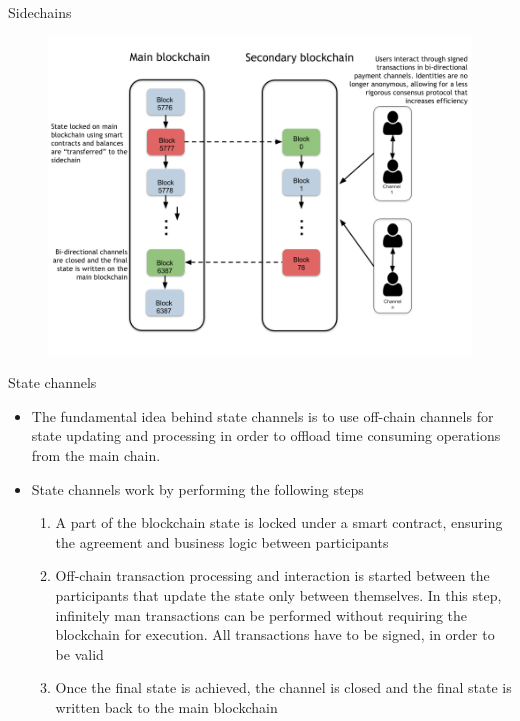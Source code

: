 \documentclass[11pt]{beamer}
\begin{document}

\begin{frame}{Sidechains}
	\begin{figure}[]
		\centering
		\includegraphics  [scale=0.3]{Images/sidechain}
	\end{figure}
\end{frame}


\begin{frame}{State channels}
	\begin{itemize}
		\item The fundamental idea behind state channels is to use off-chain channels for state updating and processing in order to offload time consuming operations from the main chain.
		\item State channels work by performing the following steps
		\begin{enumerate}
			\item A part of the blockchain state is locked under a smart contract, ensuring the agreement and business logic between participants
			\item Off-chain transaction processing and interaction is started between the participants that update the state only between themselves. In this step, infinitely man transactions can be performed without requiring the blockchain for execution. All transactions have to be signed, in order to be valid
			\item Once the final state is achieved, the channel is closed and the final state is written back to the main blockchain
		\end{enumerate}
	\end{itemize}
\end{frame}
\end{document}
